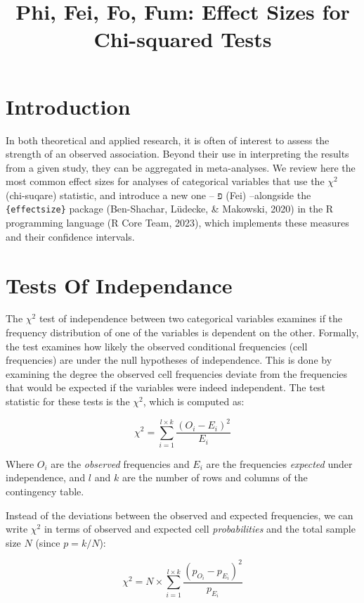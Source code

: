 \documentclass[
]{article}
\title{Phi, Fei, Fo, Fum: Effect Sizes for Chi-squared Tests}
\author{}
\date{\vspace{-2.5em}}
\begin{document}
\maketitle

\hypertarget{introduction}{%
\section{Introduction}\label{introduction}}

In both theoretical and applied research, it is often of interest to
assess the strength of an observed association. Beyond their use in
interpreting the results from a given study, they can be aggregated in
meta-analyses. We review here the most common effect sizes for analyses
of categorical variables that use the \(\chi^2\) (chi-suqare) statistic,
and introduce a new one -- \(פ\) (Fei) --alongside the
\texttt{\{effectsize\}} package (Ben-Shachar, Lüdecke, \& Makowski,
2020) in the R programming language (R Core Team, 2023), which
implements these measures and their confidence intervals.

\hypertarget{tests-of-independance}{%
\section{Tests Of Independance}\label{tests-of-independance}}

The \(\chi^2\) test of independence between two categorical variables
examines if the frequency distribution of one of the variables is
dependent on the other. Formally, the test examines how likely the
observed conditional frequencies (cell frequencies) are under the null
hypotheses of independence. This is done by examining the degree the
observed cell frequencies deviate from the frequencies that would be
expected if the variables were indeed independent. The test statistic
for these tests is the \(\chi^2\), which is computed as:

\[
\chi^2 = \sum_{i=1}^{l\times k}{\frac{(O_i-E_i)^2}{E_i}}
\]

Where \(O_i\) are the \emph{observed} frequencies and \(E_i\) are the
frequencies \emph{expected} under independence, and \(l\) and \(k\) are
the number of rows and columns of the contingency table.

Instead of the deviations between the observed and expected frequencies,
we can write \(\chi^2\) in terms of observed and expected cell
\emph{probabilities} and the total sample size \(N\) (since \(p=k/N\)):

\[
\chi^2 = N\times\sum_{i=1}^{l\times k}{\frac{(p_{O_i}-p_{E_i})^2}{p_{E_i}}}
\]
\end{document}
